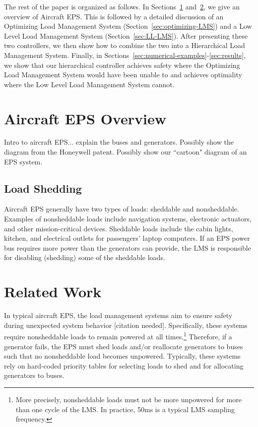 \documentclass{acm_proc_article-sp}
\begin{document}
The rest of the paper is organized as follows.
In Sections~\ref{sec:overview} and~\ref{sec:related-work}, we give an overview of Aircraft EPS. %
This is followed by a detailed discussion of an Optimizing Load Management System (Section~\ref{sec:optimizing-LMS}) and a Low Level Load Management System (Section~\ref{sec:LL-LMS}). 
After presenting these two controllers, we then show how to combine the two into a Hierarchical Load Management System. 
Finally, in Sections~\ref{sec:numerical-examples}-\ref{sec:results}, we show that our hierarchical controller achieves safety where the Optimizing Load Management System would have been unable to and achieves optimality where the Low Level Load Management System cannot.

\section{Aircraft EPS Overview}
\label{sec:overview}
Intro to aircraft EPS... explain the buses and generators.
Possibly show the diagram from the Honeywell patent.
Possibly show our ``cartoon" diagram of an EPS system.

\subsection{Load Shedding}
Aircraft EPS generally have two types of loads: sheddable and nonsheddable.
Examples of nonsheddable loads include navigation systems, electronic actuators, and other mission-critical devices.
Sheddable loads include the cabin lights, kitchen, and electrical outlets for passengers' laptop computers.
If an EPS power bus requires more power than the generators can provide, the LMS is responsible for disabling (shedding) some of the sheddable loads.

\section{Related Work}
\label{sec:related-work}
In typical aircraft EPS, the load management systems aim to ensure safety during unexpected system behavior [citation needed].
Specifically, these systems require nonsheddable loads to remain powered at all times.\footnote{More precisely, nonsheddable loads must not be more unpowered for more than one cycle of the LMS. In practice, 50ms is a typical LMS sampling frequency.} %
Therefore, if a generator fails, the EPS must shed loads and/or reallocate generators to buses such that no nonsheddable load becomes unpowered.
Typically, these systems rely on hard-coded priority tables for selecting loads to shed and for allocating generators to buses.
\end{document}
